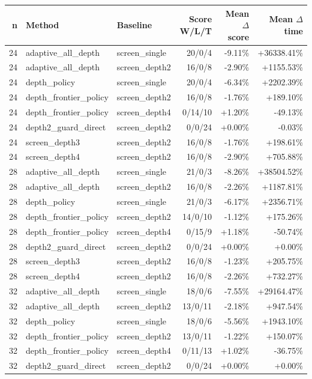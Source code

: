\begin{tabular}{rllrrr}
\toprule
n & Method & Baseline & Score W/L/T & Mean $\Delta$ score & Mean $\Delta$ time \\
\midrule
24 & adaptive_all_depth & screen_single & 20/0/4 & -9.11\% & +36338.41\% \\
24 & adaptive_all_depth & screen_depth2 & 16/0/8 & -2.90\% & +1155.53\% \\
24 & depth_policy & screen_single & 20/0/4 & -6.34\% & +2202.39\% \\
24 & depth_frontier_policy & screen_depth2 & 16/0/8 & -1.76\% & +189.10\% \\
24 & depth_frontier_policy & screen_depth4 & 0/14/10 & +1.20\% & -49.13\% \\
24 & depth2_guard_direct & screen_depth2 & 0/0/24 & +0.00\% & -0.03\% \\
24 & screen_depth3 & screen_depth2 & 16/0/8 & -1.76\% & +198.61\% \\
24 & screen_depth4 & screen_depth2 & 16/0/8 & -2.90\% & +705.88\% \\
28 & adaptive_all_depth & screen_single & 21/0/3 & -8.26\% & +38504.52\% \\
28 & adaptive_all_depth & screen_depth2 & 16/0/8 & -2.26\% & +1187.81\% \\
28 & depth_policy & screen_single & 21/0/3 & -6.17\% & +2356.71\% \\
28 & depth_frontier_policy & screen_depth2 & 14/0/10 & -1.12\% & +175.26\% \\
28 & depth_frontier_policy & screen_depth4 & 0/15/9 & +1.18\% & -50.74\% \\
28 & depth2_guard_direct & screen_depth2 & 0/0/24 & +0.00\% & +0.00\% \\
28 & screen_depth3 & screen_depth2 & 16/0/8 & -1.23\% & +205.75\% \\
28 & screen_depth4 & screen_depth2 & 16/0/8 & -2.26\% & +732.27\% \\
32 & adaptive_all_depth & screen_single & 18/0/6 & -7.55\% & +29164.47\% \\
32 & adaptive_all_depth & screen_depth2 & 13/0/11 & -2.18\% & +947.54\% \\
32 & depth_policy & screen_single & 18/0/6 & -5.56\% & +1943.10\% \\
32 & depth_frontier_policy & screen_depth2 & 13/0/11 & -1.22\% & +150.07\% \\
32 & depth_frontier_policy & screen_depth4 & 0/11/13 & +1.02\% & -36.75\% \\
32 & depth2_guard_direct & screen_depth2 & 0/0/24 & +0.00\% & +0.00\% \\

\end{tabular}
